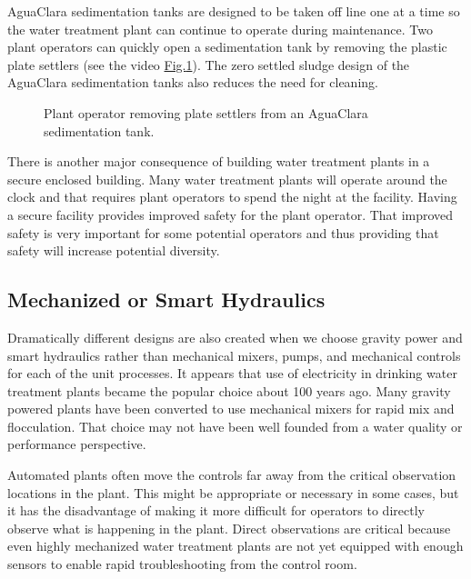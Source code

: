 \documentclass[letterpaper,10pt,english]{sphinxmanual}
\let\sphinxpxdimen\pdfpxdimen\else\newdimen\sphinxpxdimen
\begin{document}
AguaClara sedimentation tanks are designed to be taken off line one at a time so the water treatment plant can continue to operate during maintenance. Two plant operators can quickly open a sedimentation tank by removing the plastic plate settlers (see the video \hyperref[\detokenize{Introduction/Introduction:figure-removing-plate-settlers}]{Fig.\@ \ref{\detokenize{Introduction/Introduction:figure-removing-plate-settlers}}}). The zero settled sludge design of the AguaClara sedimentation tanks also reduces the need for cleaning.

\begin{figure}[htbp]
\centering
\capstart
\sphinxhref{http://www.youtube.com/watch?v=vZ2f6mduEls}{\sphinxincludegraphics[width=300\sphinxpxdimen]{{01}.jpg}}\caption{Plant operator removing plate settlers from an AguaClara sedimentation tank.}\label{\detokenize{Introduction/Introduction:id24}}\label{\detokenize{Introduction/Introduction:figure-removing-plate-settlers}}\end{figure}

There is another major consequence of building water treatment plants in a secure enclosed building. Many water treatment plants will operate around the clock and that requires plant operators to spend the night at the facility. Having a secure facility provides improved safety for the plant operator. That improved safety is very important for some potential operators and thus providing that safety will increase potential diversity.


\subsection{Mechanized or Smart Hydraulics}
\label{\detokenize{Introduction/Introduction:mechanized-or-smart-hydraulics}}\label{\detokenize{Introduction/Introduction:heading-mechanized-or-smart-hydraulics}}
Dramatically different designs are also created when we choose gravity power and smart hydraulics rather than mechanical mixers, pumps, and mechanical controls for each of the unit processes. It appears that use of electricity in drinking water treatment plants became the popular choice about 100 years ago. Many gravity powered plants have been converted to use mechanical mixers for rapid mix and flocculation. That choice may not have been well founded from a water quality or performance perspective.

Automated plants often move the controls far away from the critical observation locations in the plant. This might be appropriate or necessary in some cases, but it has the disadvantage of making it more difficult for operators to directly observe what is happening in the plant. Direct observations are critical because even highly mechanized water treatment plants are not yet equipped with enough sensors to enable rapid troubleshooting from the control room.
\end{document}
